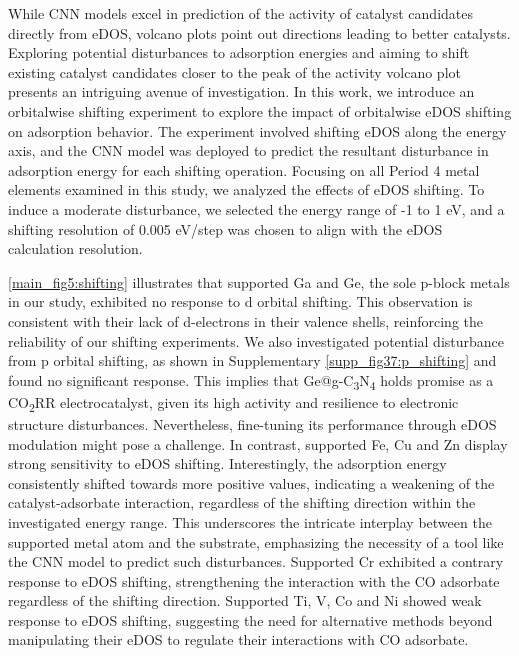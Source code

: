     While CNN models excel in prediction of the activity of catalyst candidates directly from eDOS, volcano plots point out directions leading to better catalysts.
    Exploring potential disturbances to adsorption energies and aiming to shift existing catalyst candidates closer to the peak of the activity volcano plot presents an intriguing avenue of investigation.
    In this work, we introduce an orbitalwise shifting experiment to explore the impact of orbitalwise eDOS shifting on adsorption behavior.
    The experiment involved shifting eDOS along the energy axis, and the CNN model was deployed to predict the resultant disturbance in adsorption energy for each shifting operation.
    Focusing on all Period 4 metal elements examined in this study, we analyzed the effects of eDOS shifting.
    To induce a moderate disturbance, we selected the energy range of -1 to 1 eV, and a shifting resolution of 0.005 eV/step was chosen to align with the eDOS calculation resolution.

    \cref{main_fig5:shifting} illustrates that supported Ga and Ge, the sole p-block metals in our study, exhibited no response to d orbital shifting.
    This observation is consistent with their lack of d-electrons in their valence shells, reinforcing the reliability of our shifting experiments.
    We also investigated potential disturbance from p orbital shifting, as shown in Supplementary \cref{supp_fig37:p_shifting} and found no significant response.
    This implies that Ge@g-C\textsubscript{3}N\textsubscript{4} holds promise as a CO\textsubscript{2}RR electrocatalyst, given its high activity and resilience to electronic structure disturbances.
    Nevertheless, fine-tuning its performance through eDOS modulation might pose a challenge.
    In contrast, supported Fe, Cu and Zn display strong sensitivity to eDOS shifting.
    Interestingly, the adsorption energy consistently shifted towards more positive values, indicating a weakening of the catalyst-adsorbate interaction, regardless of the shifting direction within the investigated energy range.
    This underscores the intricate interplay between the supported metal atom and the substrate, emphasizing the necessity of a tool like the CNN model to predict such disturbances.
    Supported Cr exhibited a contrary response to eDOS shifting, strengthening the interaction with the CO adsorbate regardless of the shifting direction.
    Supported Ti, V, Co and Ni showed weak response to eDOS shifting, suggesting the need for alternative methods beyond manipulating their eDOS to regulate their interactions with CO adsorbate.


